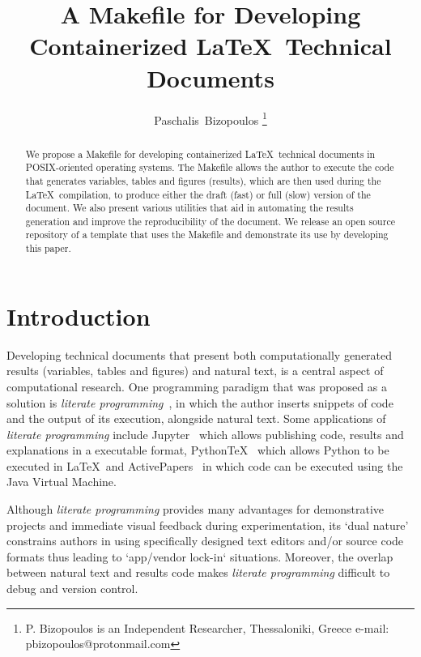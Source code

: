 \documentclass[journal]{IEEEtran}
\begin{document}

\title{A Makefile for Developing Containerized \LaTeX\ Technical Documents}

\author{Paschalis~Bizopoulos
\thanks{P. Bizopoulos is an Independent Researcher, Thessaloniki, Greece e-mail: pbizopoulos@protonmail.com}}

\maketitle

\begin{abstract}
	We propose a Makefile for developing containerized \LaTeX\ technical documents in POSIX-oriented operating systems.
	The Makefile allows the author to execute the code that generates variables, tables and figures (results), which are then used during the \LaTeX\ compilation, to produce either the draft (fast) or full (slow) version of the document.
	We also present various utilities that aid in automating the results generation and improve the reproducibility of the document.
	We release an open source repository of a template that uses the Makefile and demonstrate its use by developing this paper.
\end{abstract}

\section{Introduction}
Developing technical documents that present both computationally generated results (variables, tables and figures) and natural text, is a central aspect of computational research.
One programming paradigm that was proposed as a solution is \textit{literate programming}~\cite{knuth1984literate}, in which the author inserts snippets of code and the output of its execution, alongside natural text.
Some applications of \textit{literate programming} include Jupyter~\cite{kluyver2016jupyter} which allows publishing code, results and explanations in a executable format, PythonTeX~\cite{poore2015pythontex} which allows Python to be executed in \LaTeX\ and ActivePapers~\cite{hinsen2014activepapers} in which code can be executed using the Java Virtual Machine.

Although \textit{literate programming} provides many advantages for demonstrative projects and immediate visual feedback during experimentation, its `dual nature' constrains authors in using specifically designed text editors and/or source code formats thus leading to `app/vendor lock-in` situations.
Moreover, the overlap between natural text and results code makes \textit{literate programming} difficult to debug and version control.
\end{document}
